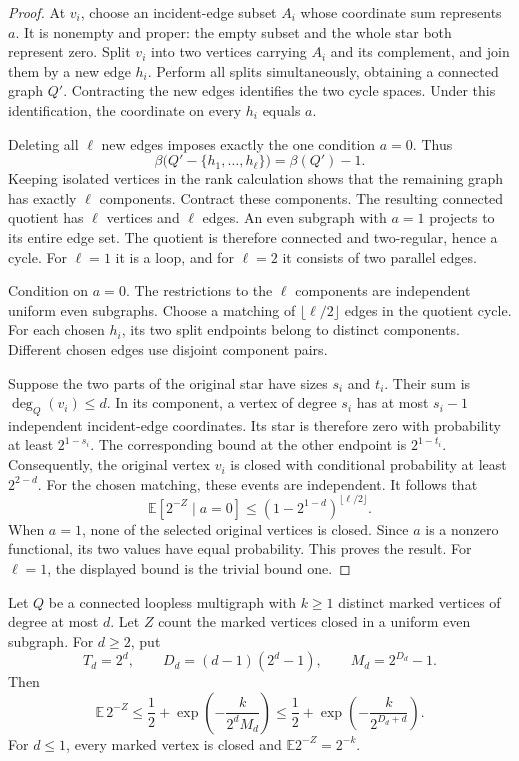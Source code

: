 \begin{proof}
At $v_i$, choose an incident-edge subset $A_i$ whose coordinate sum represents $a$.
It is nonempty and proper: the empty subset and the whole star both represent zero.
Split $v_i$ into two vertices carrying $A_i$ and its complement, and join them by a new edge $h_i$.
Perform all splits simultaneously, obtaining a connected graph $Q'$.
Contracting the new edges identifies the two cycle spaces.
Under this identification, the coordinate on every $h_i$ equals $a$.

Deleting all $\ell$ new edges imposes exactly the one condition $a=0$.
Thus
\[
 \beta\bigl(Q'-\{h_1,\ldots,h_\ell\}\bigr)=\beta(Q')-1.
\]
Keeping isolated vertices in the rank calculation shows that the remaining graph has exactly $\ell$ components.
Contract these components.
The resulting connected quotient has $\ell$ vertices and $\ell$ edges.
An even subgraph with $a=1$ projects to its entire edge set.
The quotient is therefore connected and two-regular, hence a cycle.
For $\ell=1$ it is a loop, and for $\ell=2$ it consists of two parallel edges.

Condition on $a=0$.
The restrictions to the $\ell$ components are independent uniform even subgraphs.
Choose a matching of $\lfloor\ell/2\rfloor$ edges in the quotient cycle.
For each chosen $h_i$, its two split endpoints belong to distinct components.
Different chosen edges use disjoint component pairs.

Suppose the two parts of the original star have sizes $s_i$ and $t_i$.
Their sum is $\deg_Q(v_i)\le d$.
In its component, a vertex of degree $s_i$ has at most $s_i-1$ independent incident-edge coordinates.
Its star is therefore zero with probability at least $2^{1-s_i}$.
The corresponding bound at the other endpoint is $2^{1-t_i}$.
Consequently, the original vertex $v_i$ is closed with conditional probability at least $2^{2-d}$.
For the chosen matching, these events are independent.
It follows that
\[
 \mathbb E[2^{-Z}\mid a=0]
 \le\left(1-2^{1-d}\right)^{\lfloor\ell/2\rfloor}.
\]
When $a=1$, none of the selected original vertices is closed.
Since $a$ is a nonzero functional, its two values have equal probability.
This proves the result.
For $\ell=1$, the displayed bound is the trivial bound one.
\end{proof}

\begin{theorem}\label{thm:exponential-closed-stars}
Let $Q$ be a connected loopless multigraph with $k\ge1$ distinct marked vertices of degree at most $d$.
Let $Z$ count the marked vertices closed in a uniform even subgraph.
For $d\ge2$, put
\[
 T_d=2^d,\qquad D_d=(d-1)(2^d-1),\qquad M_d=2^{D_d}-1.
\]
Then
\begin{equation}\label{eq:exponential-closed-stars}
 \mathbb E\,2^{-Z}
 \le\frac12+\exp\!\left(-\frac{k}{2^d M_d}\right)
 \le\frac12+\exp\!\left(-\frac{k}{2^{D_d+d}}\right).
\end{equation}
For $d\le1$, every marked vertex is closed and $\mathbb E2^{-Z}=2^{-k}$.
\end{theorem}

